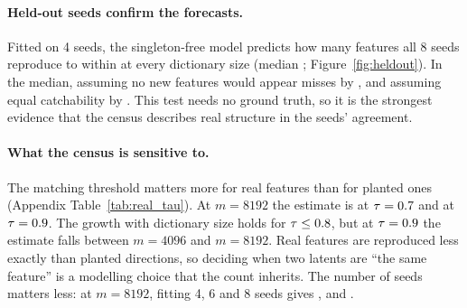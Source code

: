 \paragraph{Held-out seeds confirm the forecasts.} Fitted on 4 seeds, the singleton-free model predicts how many features all 8 seeds reproduce to within \HeldRealSfMax{} at every dictionary size (median \HeldRealSfMed; Figure~\ref{fig:heldout}). In the median, assuming no new features would appear misses by \HeldRealNoGrowthMed, and assuming equal catchability by \HeldRealMZeroMed. This test needs no ground truth, so it is the strongest evidence that the census describes real structure in the seeds' agreement.

\paragraph{What the census is sensitive to.} The matching threshold matters more for real features than for planted ones (Appendix Table~\ref{tab:real_tau}). At $m=8192$ the estimate is \RealSfEightTauLo{} at $\tau=0.7$ and \RealSfEightTauHi{} at $\tau=0.9$. The growth with dictionary size holds for $\tau\le0.8$, but at $\tau=0.9$ the estimate falls between $m=4096$ and $m=8192$. Real features are reproduced less exactly than planted directions, so deciding when two latents are ``the same feature'' is a modelling choice that the count inherits. The number of seeds matters less: at $m=8192$, fitting 4, 6 and 8 seeds gives \RealSfEightKFour, \RealSfEightKSix{} and \RealSfEight.


